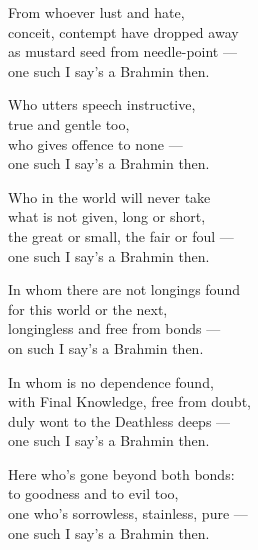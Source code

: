 \begin{MyDescription}{}
From whoever lust and hate,\\
conceit, contempt have dropped away\\
as mustard seed from needle-point —\\
one such I say's a Brahmin then.
\end{MyDescription}

\begin{MyDescription}{}
Who utters speech instructive,\\
true and gentle too,\\
who gives offence to none —\\
one such I say's a Brahmin then.
\end{MyDescription}

\begin{MyDescription}{}
Who in the world will never take\\
what is not given, long or short,\\
the great or small, the fair or foul —\\
one such I say's a Brahmin then.
\end{MyDescription}

\begin{MyDescription}{}
In whom there are not longings found\\
for this world or the next,\\
longingless and free from bonds —\\
on such I say's a Brahmin then.
\end{MyDescription}

\begin{MyDescription}{}
In whom is no dependence found,\\
with Final Knowledge, free from doubt,\\
duly wont to the Deathless deeps —\\
one such I say's a Brahmin then.
\end{MyDescription}

\begin{MyDescription}{}
Here who's gone beyond both bonds:\\
to goodness and to evil too,\\
one who's sorrowless, stainless, pure —\\
one such I say's a Brahmin then.
\end{MyDescription}

